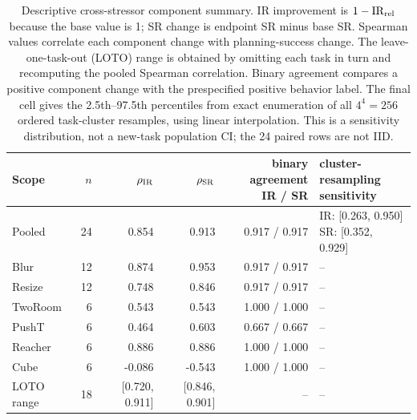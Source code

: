 \begin{table}[H]
\centering
\caption{Descriptive cross-stressor component summary. IR improvement is $1-\mathrm{IR}_{\rm rel}$ because the base value is 1; SR change is endpoint SR minus base SR. Spearman values correlate each component change with planning-success change. The leave-one-task-out (LOTO) range is obtained by omitting each task in turn and recomputing the pooled Spearman correlation. Binary agreement compares a positive component change with the prespecified positive behavior label. The final cell gives the 2.5th--97.5th percentiles from exact enumeration of all $4^4=256$ ordered task-cluster resamples, using linear interpolation. This is a sensitivity distribution, not a new-task population CI; the 24 paired rows are not IID.}
\label{tab:cross-stressor-components-v1}
\scriptsize
\setlength{\tabcolsep}{4pt}
\begin{tabular}{lrrrrl}
\toprule
Scope & $n$ & $\rho_{\rm IR}$ & $\rho_{\rm SR}$ & \shortstack{binary agreement\\IR / SR} & \shortstack{cluster-resampling\\sensitivity} \\
\midrule
Pooled & 24 & 0.854 & 0.913 & 0.917 / 0.917 & \shortstack{IR: [0.263, 0.950]\\SR: [0.352, 0.929]} \\
Blur & 12 & 0.874 & 0.953 & 0.917 / 0.917 & -- \\
Resize & 12 & 0.748 & 0.846 & 0.917 / 0.917 & -- \\
\midrule
TwoRoom & 6 & 0.543 & 0.543 & 1.000 / 1.000 & -- \\
PushT & 6 & 0.464 & 0.603 & 0.667 / 0.667 & -- \\
Reacher & 6 & 0.886 & 0.886 & 1.000 / 1.000 & -- \\
Cube & 6 & -0.086 & -0.543 & 1.000 / 1.000 & -- \\
\midrule
LOTO range & 18 & [0.720, 0.911] & [0.846, 0.901] & -- & -- \\
\bottomrule
\end{tabular}
\end{table}
